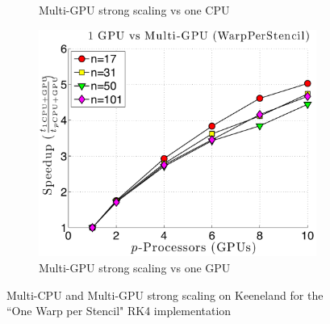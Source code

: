 \begin{figure}
\begin{subfigure}[t]{0.425\textwidth}
\caption{Multi-GPU strong scaling vs one CPU}
\label{fig:alltoall_multigpu_vs_cpu_scaling}
\end{subfigure} 
\begin{subfigure}[t]{0.425\textwidth}
\centering
\includegraphics[width=1.0\textwidth]{../figures/keeneland_results/alltoallv_cosine/speedup_1GPU_vs_NGPU_WarpPerStencil.pdf}
\caption{Multi-GPU strong scaling vs one GPU}
\label{fig:alltoall_multigpu_vs_gpu_scaling}
\end{subfigure} 
\caption{Multi-CPU and Multi-GPU strong scaling on Keeneland for the ``One Warp per Stencil" RK4 implementation}
\end{figure}

